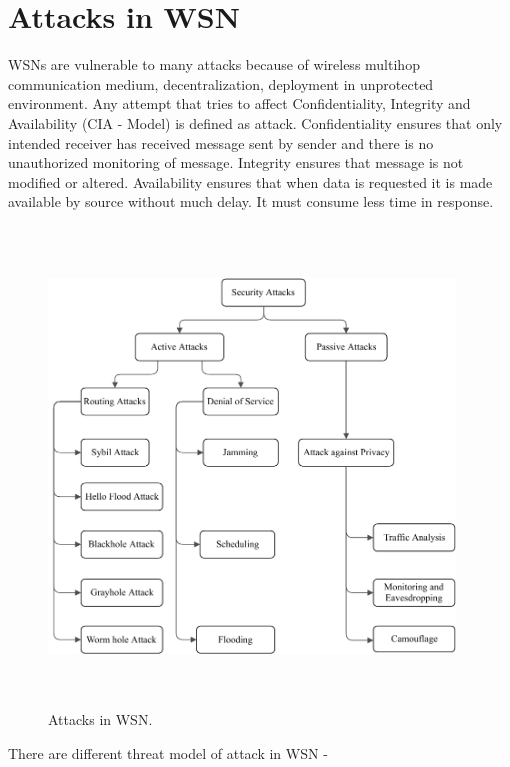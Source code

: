 \section{Attacks in WSN} \label{S2.2}
WSNs are vulnerable to many attacks because of wireless multihop communication medium, decentralization, deployment in unprotected environment. Any attempt that tries to affect Confidentiality, Integrity and Availability (CIA - Model) is defined as attack. Confidentiality ensures that only intended receiver has received message sent by sender and there is no unauthorized monitoring of message. Integrity ensures that message is not modified or altered. Availability ensures that when data is requested it is made available by source without much delay. It must consume less time in response.
\begin{figure}[h]
\center	
\includegraphics[width=4.25in, height=5in]{Figures/PDF/WSN-attacks.pdf}
\caption{Attacks in WSN.}
\label{WSN-Attacks}	
\end{figure}
\noindent
There are different threat model of attack in WSN \cite{roosta2006taxonomy}- \\
